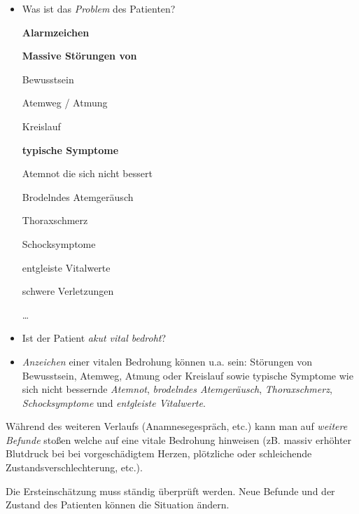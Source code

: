 \documentclass{article}
\newcommand\gE[1]{\textit{#1}}
\begin{document}
\begin{itemize}
\item {\mdseries
Was ist das \gE{Problem} des Patienten?}

\begin{center}
\begin{minipage}{3.863cm}
{\centering\bfseries\color{black}
Alarmzeichen
\par}

{\centering\bfseries\color{black}
Massive St\"orungen von 
\par}

Bewusstsein

Atemweg / Atmung 

Kreislauf 

{\centering\bfseries\color{black}
typische Symptome 
\par}

Atemnot die sich nicht bessert 

Brodelndes Atemger\"ausch 

Thoraxschmerz  

Schocksymptome 

entgleiste Vitalwerte

schwere Verletzungen

{\dots} 

\end{minipage}
\end{center}
\item {\mdseries
Ist der Patient \gE{akut vital bedroht}?}

\end{itemize}
\begin{itemize}
\item {\mdseries
\gE{Anzeichen} einer vitalen Bedrohung k\"onnen u.a.
sein: St\"orungen von Be\-wusstsein, Atemweg, Atmung oder Kreislauf
sowie typische Symptome wie sich nicht bessernde
\gE{Atemnot}, \gE{brodelndes
Atem\-ge\-r\"ausch}, \gE{Thoraxschmerz},
\gE{Schocksymptome} und \gE{entgleiste
Vital\-werte}.}

\end{itemize}
{\mdseries
W\"ahrend des weiteren Verlaufs (Anamnesegespr\"ach, etc.) kann man auf
\gE{weitere Befunde} sto{\ss}en welche auf eine vitale
Be\-drohung hinweisen (zB. massiv erh\"ohter Blutdruck bei bei
vor\-ge\-sch\"adigtem Herzen, pl\"otzliche oder schleichende
Zustands\-verschlechterung, etc.). }

{\mdseries
Die Ersteinsch\"atzung muss st\"andig \"uberpr\"uft werden. Neue Befunde
und der Zustand des Patienten k\"onnen die Situation \"andern.}
\end{document}
